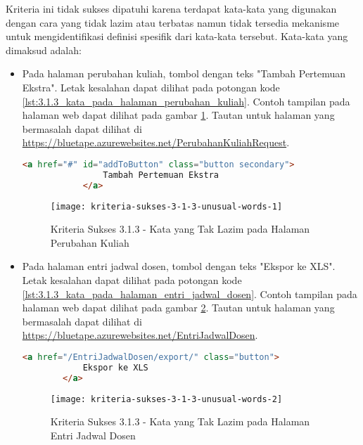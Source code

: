 Kriteria ini tidak sukses dipatuhi karena terdapat kata-kata yang digunakan dengan cara yang tidak lazim atau terbatas namun tidak tersedia mekanisme untuk mengidentifikasi definisi spesifik dari kata-kata tersebut. Kata-kata yang dimaksud adalah:

\begin{itemize}
    \item Pada halaman perubahan kuliah, tombol dengan teks "Tambah Pertemuan Ekstra". Letak kesalahan dapat dilihat pada potongan kode \ref{lst:3.1.3_kata_pada_halaman_perubahan_kuliah}. Contoh tampilan pada halaman web dapat dilihat pada gambar \ref{fig:3.1.3_unusual_words_1}. Tautan untuk halaman yang bermasalah dapat dilihat di \url{https://bluetape.azurewebsites.net/PerubahanKuliahRequest}.
    \begin{lstlisting}[frame=single, label={lst:3.1.3_kata_pada_halaman_perubahan_kuliah}, language=HTML, caption=Kriteria Sukses 3.1.3 - Kata yang Tak Lazim pada Halaman Perubahan Kuliah]
            <a href="#" id="addToButton" class="button secondary">
                Tambah Pertemuan Ekstra
            </a>
    \end{lstlisting}
    
    \begin{figure}[H]
        \centering  
        \texttt{[image: kriteria-sukses-3-1-3-unusual-words-1]}  
        \caption[Kriteria Sukses 3.1.3 - Kata yang Tak Lazim pada Halaman Perubahan Kuliah]{Kriteria Sukses 3.1.3 - Kata yang Tak Lazim pada Halaman Perubahan Kuliah}
        \label{fig:3.1.3_unusual_words_1}  
    \end{figure}
    
    \item Pada halaman entri jadwal dosen, tombol dengan teks "Ekspor ke XLS". Letak kesalahan dapat dilihat pada potongan kode \ref{lst:3.1.3_kata_pada_halaman_entri_jadwal_dosen}. Contoh tampilan pada halaman web dapat dilihat pada gambar \ref{fig:3.1.3_unusual_words_2}. Tautan untuk halaman yang bermasalah dapat dilihat di \url{https://bluetape.azurewebsites.net/EntriJadwalDosen}.
    \begin{lstlisting}[frame=single, label={lst:3.1.3_kata_pada_halaman_entri_jadwal_dosen}, language=HTML, caption=Kriteria Sukses 3.1.3 - Kata yang Tak Lazim pada Halaman Entri Jadwal Dosen]
        <a href="/EntriJadwalDosen/export/" class="button">
            Ekspor ke XLS
        </a>
    \end{lstlisting}
    
    \begin{figure}[H]
        \centering  
        \texttt{[image: kriteria-sukses-3-1-3-unusual-words-2]}  
        \caption[Kriteria Sukses 3.1.3 - Kata yang Tak Lazim pada Halaman Entri Jadwal Dosen]{Kriteria Sukses 3.1.3 - Kata yang Tak Lazim pada Halaman Entri Jadwal Dosen}
        \label{fig:3.1.3_unusual_words_2}  
    \end{figure}


\end{itemize}
